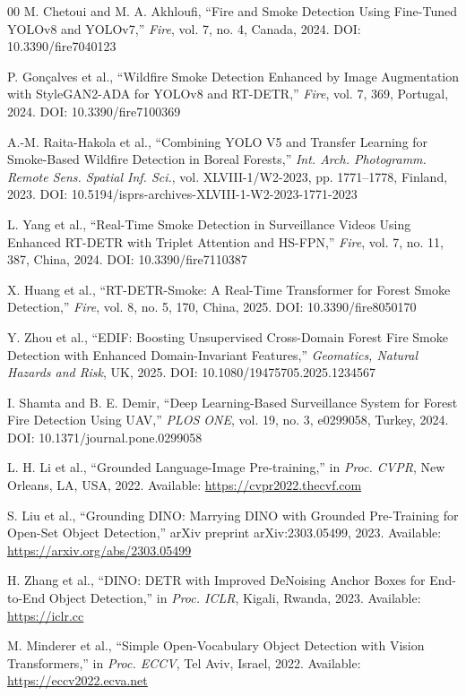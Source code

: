 \documentclass[conference]{IEEEtran}
\begin{document}
\begin{thebibliography}{00}
M. Chetoui and M. A. Akhloufi,
``Fire and Smoke Detection Using Fine-Tuned YOLOv8 and YOLOv7,''
\textit{Fire}, vol. 7, no. 4, Canada, 2024. DOI: 10.3390/fire7040123

P. Gon\c{c}alves et al.,
``Wildfire Smoke Detection Enhanced by Image Augmentation with StyleGAN2-ADA for YOLOv8 and RT-DETR,''
\textit{Fire}, vol. 7, 369, Portugal, 2024. DOI: 10.3390/fire7100369

A.-M. Raita-Hakola et al.,
``Combining YOLO V5 and Transfer Learning for Smoke-Based Wildfire Detection in Boreal Forests,''
\textit{Int. Arch. Photogramm. Remote Sens. Spatial Inf. Sci.},
vol. XLVIII-1/W2-2023, pp. 1771--1778, Finland, 2023. DOI: 10.5194/isprs-archives-XLVIII-1-W2-2023-1771-2023

L. Yang et al.,
``Real-Time Smoke Detection in Surveillance Videos Using Enhanced RT-DETR with Triplet Attention and HS-FPN,''
\textit{Fire}, vol. 7, no. 11, 387, China, 2024. DOI: 10.3390/fire7110387

X. Huang et al.,
``RT-DETR-Smoke: A Real-Time Transformer for Forest Smoke Detection,''
\textit{Fire}, vol. 8, no. 5, 170, China, 2025. DOI: 10.3390/fire8050170

Y. Zhou et al.,
``EDIF: Boosting Unsupervised Cross-Domain Forest Fire Smoke Detection with Enhanced Domain-Invariant Features,''
\textit{Geomatics, Natural Hazards and Risk}, UK, 2025. DOI: 10.1080/19475705.2025.1234567

I. Shamta and B. E. Demir,
``Deep Learning-Based Surveillance System for Forest Fire Detection Using UAV,''
\textit{PLOS ONE}, vol. 19, no. 3, e0299058, Turkey, 2024. DOI: 10.1371/journal.pone.0299058

L. H. Li et al.,
``Grounded Language-Image Pre-training,''
in \textit{Proc. CVPR}, New Orleans, LA, USA, 2022. Available: \url{https://cvpr2022.thecvf.com}

S. Liu et al.,
``Grounding DINO: Marrying DINO with Grounded Pre-Training for Open-Set Object Detection,''
arXiv preprint arXiv:2303.05499, 2023. Available: \url{https://arxiv.org/abs/2303.05499}

H. Zhang et al.,
``DINO: DETR with Improved DeNoising Anchor Boxes for End-to-End Object Detection,''
in \textit{Proc. ICLR}, Kigali, Rwanda, 2023. Available: \url{https://iclr.cc}

M. Minderer et al.,
``Simple Open-Vocabulary Object Detection with Vision Transformers,''
in \textit{Proc. ECCV}, Tel Aviv, Israel, 2022. Available: \url{https://eccv2022.ecva.net}


\end{thebibliography}
\end{document}
